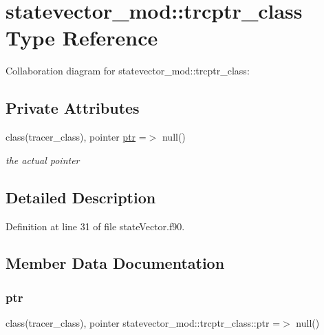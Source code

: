 \hypertarget{structstatevector__mod_1_1trcptr__class}{}\section{statevector\+\_\+mod\+:\+:trcptr\+\_\+class Type Reference}
\label{structstatevector__mod_1_1trcptr__class}


Collaboration diagram for statevector\+\_\+mod\+:\+:trcptr\+\_\+class\+:
\subsection*{Private Attributes}
\begin{DoxyCompactItemize}
\item 
class(tracer\+\_\+class), pointer \mbox{\hyperlink{structstatevector__mod_1_1trcptr__class_a1d7a04c6843655cbf92923320b3f2c37}{ptr}} =$>$ null()
\begin{DoxyCompactList}\small\item\em the actual pointer \end{DoxyCompactList}\end{DoxyCompactItemize}


\subsection{Detailed Description}


Definition at line 31 of file state\+Vector.\+f90.



\subsection{Member Data Documentation}
\mbox{\label{structstatevector__mod_1_1trcptr__class_a1d7a04c6843655cbf92923320b3f2c37}} 
\subsubsection{\texorpdfstring{ptr}{ptr}}
{\footnotesize\ttfamily class(tracer\+\_\+class), pointer statevector\+\_\+mod\+::trcptr\+\_\+class\+::ptr =$>$ null()\hspace{0.3cm}{\ttfamily [private]}}



